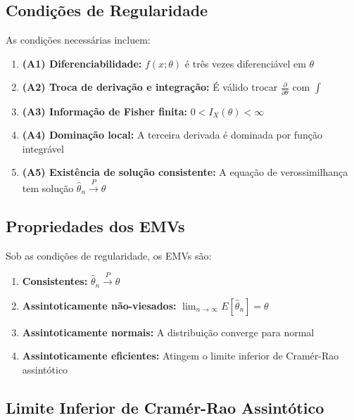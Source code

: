 \documentclass[12pt,a4paper]{article}
\theoremstyle{definition}
\theoremstyle{plain}
\begin{document}
\subsection{Condições de Regularidade}

As condições necessárias incluem:

\begin{enumerate}
    \item \textbf{(A1) Diferenciabilidade:} $f(x; \theta)$ é três vezes diferenciável em $\theta$
    
    \item \textbf{(A2) Troca de derivação e integração:} É válido trocar $\frac{\partial}{\partial \theta}$ com $\int$
    
    \item \textbf{(A3) Informação de Fisher finita:} $0 < I_X(\theta) < \infty$
    
    \item \textbf{(A4) Dominação local:} A terceira derivada é dominada por função integrável
    
    \item \textbf{(A5) Existência de solução consistente:} A equação de verossimilhança tem solução $\hat{\theta}_n \xrightarrow{P} \theta$
\end{enumerate}

\subsection{Propriedades dos EMVs}

Sob as condições de regularidade, os EMVs são:

\begin{enumerate}
    \item \textbf{Consistentes:} $\hat{\theta}_n \xrightarrow{P} \theta$
    
    \item \textbf{Assintoticamente não-viesados:} $\lim_{n \to \infty} E[\hat{\theta}_n] = \theta$
    
    \item \textbf{Assintoticamente normais:} A distribuição converge para normal
    
    \item \textbf{Assintoticamente eficientes:} Atingem o limite inferior de Cramér-Rao assintótico
\end{enumerate}

\subsection{Limite Inferior de Cramér-Rao Assintótico}
\end{document}
